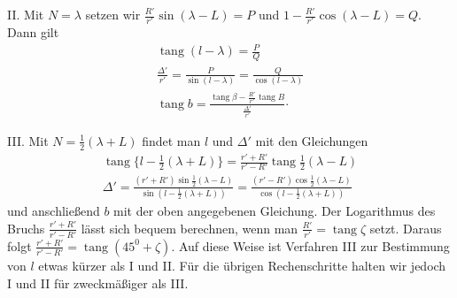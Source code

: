 II. Mit $N=\lambda$ setzen wir $\frac{R'}{r'}\sin(\lambda-L)=P$ und $1-\frac{R'}{r'}\cos(\lambda-L)=Q$. Dann gilt
\[
\begin{gathered}
\operatorname{tang}(l-\lambda)=\frac{P}{Q}\\[.5em]
\frac{\Delta'}{r'}=\frac{P}{\sin(l-\lambda)}=\frac{Q}{\cos(l-\lambda)}\\[.5em]
\operatorname{tang}b=\frac{\operatorname{tang}\beta-\frac{R'}{r'}\operatorname{tang}B}{\frac{\Delta'}{r'}}\mathord{\cdot}
\end{gathered}
\]

III. Mit $N=\frac12(\lambda+L)$ findet man $l$ und $\Delta'$ mit den Gleichungen
\[
\begin{gathered}
\operatorname{tang}\{l-\tfrac12(\lambda+L)\}=\frac{r'+R'}{r'-R'}\operatorname{tang}\tfrac12(\lambda-L)\\[.5em]
\Delta'=\frac{(r'+R')\sin\frac12(\lambda-L)}{\sin(l-\frac12(\lambda+L))}=\frac{(r'-R')\cos\frac12(\lambda-L)}{\cos(l-\frac12(\lambda+L))}
\end{gathered}
\]
und anschließend $b$ mit der oben angegebenen Gleichung. Der Logarithmus des Bruchs $\frac{r'+R'}{r'-R'}$ lässt sich bequem berechnen, wenn man $\frac{R'}{r'}=\operatorname{tang}\zeta$ setzt. Daraus folgt $\frac{r'+R'}{r'-R'}=\operatorname{tang}(45^0+\zeta)$. Auf diese Weise ist Verfahren III zur Bestimmung von $l$ etwas kürzer als I und II. Für die übrigen Rechenschritte halten wir jedoch I und II für zweckmäßiger als III.
